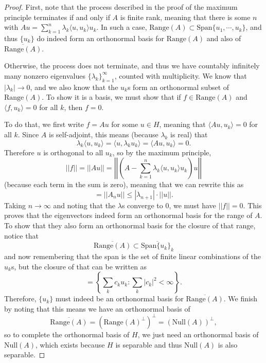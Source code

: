 \begin{proof}
First, note that the process described in the proof of the maximum principle terminates if and only if $A$ is finite rank, meaning that there is some $n$ with $Au = \sum_{k=1}^n \lambda_k \langle u, u_k \rangle u_k$. In such a case, $\text{Range}(A) \subset \text{Span}\{u_1, \cdots, u_k\}$, and thus $\{u_k\}$ do indeed form an orthonormal basis for $\text{Range}(A)$ and also of $\overline{\text{Range}(A)}$. 

Otherwise, the process does not terminate, and thus we have countably infinitely many nonzero eigenvalues $\{\lambda_k\}_{k=1}^{\infty}$, counted with multiplicity. We know that $|\lambda_k| \to 0$, and we also know that the $u_k$s form an orthonormal subset of $\text{Range}(A)$. To show it is a basis, we must show that if $f \in \text{Range}(A)$ and $\langle f, u_k \rangle = 0$ for all $k$, then $f = 0$. 

To do that, we first write $f = Au$ for some $u \in H$, meaning that $\langle Au, u_k \rangle = 0$ for all $k$. Since $A$ is self-adjoint, this means (because $\lambda_k$ is real) that
\[
    \lambda_k \langle u, u_k \rangle = \langle u, \lambda_k u_k \rangle = \langle Au, u_k \rangle = 0.
\]
Therefore $u$ is orthogonal to all $u_k$, so by the maximum principle, 
\[
    ||f|| = ||Au|| = \left|\left|\left(A - \sum_{k=1}^n \lambda_k \langle u, u_k \rangle u_k\right) u\right|\right|
\]
(because each term in the sum is zero), meaning that we can rewrite this as 
\[
    = ||A_nu|| \le |\lambda_{n+1}| \cdot ||u||.
\]
Taking $n \to \infty$ and noting that the $\lambda$s converge to $0$, we must have $||f|| = 0$. This proves that the eigenvectors indeed form an orthonormal basis for the range of $A$. To show that they also form an orthonormal basis for the closure of that range, notice that
\[
    \overline{\text{Range}(A)} \subset \overline{\text{Span}\{u_k\}_k}
\]
and now remembering that the span is the set of finite linear combinations of the $u_k$s, but the closure of that can be written as 
\[
    = \left\{\sum_k c_k u_k: \sum_k |c_k|^2 < \infty\right\}.
\]
Therefore, $\{u_k\}$ must indeed be an orthonormal basis for $\overline{\text{Range}(A)}$. We finish by noting that this means we have an orthonormal basis of 
\[
    \overline{\text{Range}(A)} = (\text{Range}(A)^\perp)^\perp = (\text{Null}(A))^\perp,
\]
so to complete the orthonormal basis of $H$, we just need an orthonormal basis of $\text{Null}(A)$, which exists because $H$ is separable and thus $\text{Null}(A)$ is also separable.
\end{proof}

